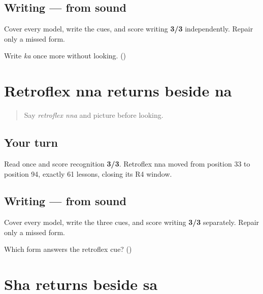 \subsection*{Writing — from sound}
Cover every model, write the cues, and score writing \textbf{3/3} independently. Repair only a missed form.

\begin{tcolorbox}[breakable,colback=teal!4,colframe=teal!35!black,title={Before you move on}]
Write \emph{ka} once more without looking. (\textbf{})
\end{tcolorbox}
\section[\texorpdfstring{\gu{ણ} \gu{ન} (retroflex nna — na)}{ણ ન (retroflex nna — na)}]{Retroflex nna returns beside na}

\label{lesson:GU-R15-nna-r4}



\begin{quote}
Say \emph{retroflex nna} and picture \textbf{} before looking.
\end{quote}

\subsection*{Your turn}
Read \textbf{  } once and score recognition \textbf{3/3}. Retroflex nna moved from position 33 to position 94, exactly 61 lessons, closing its R4 window.

\subsection*{Writing — from sound}
Cover every model, write the three cues, and score writing \textbf{3/3} separately. Repair only a missed form.

\begin{tcolorbox}[breakable,colback=teal!4,colframe=teal!35!black,title={Before you move on}]
Which form answers the retroflex cue? (\textbf{})
\end{tcolorbox}
\section[\texorpdfstring{\gu{શ} \gu{સ} (sha — sa)}{શ સ (sha — sa)}]{Sha returns beside sa}

\label{lesson:GU-R15-sha-r4}




